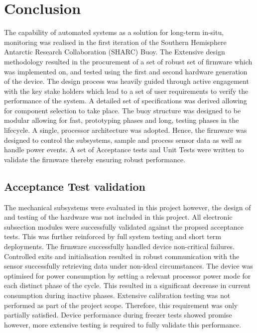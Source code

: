 

\chapter{Conclusion}
\label{ch:conclusion}
The capability of automated systems as a solution for long-term in-situ, monitoring was realised in the first iteration of the Southern Hemisphere Antarctic Research Collaboration (SHARC) Buoy. The  Extensive design methodology resulted in the procurement of a set of robust set of firmware which was implemented on, and tested using  the first and second hardware generation of the device. The design process was heavily guided through active engagement with the key stake holders which lead to a set of user requirements to verify the performance of the system. A detailed set of specifications was derived allowing for component selection to take place. The buoy structure was designed to be modular allowing for fast, prototyping phases and long, testing phases in the lifecycle. A single, processor architecture was adopted. Hence, the firmware was designed to control the subsystems, sample and process sensor data as well as handle power events. A set of Acceptance tests and Unit Tests were written to validate the firmware thereby ensuring robust performance.

\section{Acceptance Test validation}

The mechanical subsystems were evaluated in this project however, the design of and testing of the hardware was not included in this project. All electronic subsection modules were successfully validated against the propsed acceptance tests. This was further reinforced by full system testing and short term deployments. The firmware successfully handled device non-critical failures. Controlled exits and initialisation resulted in robust communication with the sensor successfully retrieving data under non-ideal circumstances. The device was optimised for power consumption by setting a relevant processor power mode for each distinct phase of the cycle. This resulted in a significant decrease in current consumption during inactive phases. Extensive calibration testing was not performed as part of the project scope. Therefore, this requirement was only partially satisfied. Device performance during freezer tests showed promise however, more extensive testing is required to fully validate this performance.

